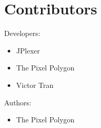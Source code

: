 \documentclass{article}
\begin{document}
\section{Contributors}
Developers:
\begin{itemize}
    \item JPlexer
    \item The Pixel Polygon
    \item Victor Tran
\end{itemize}
Authors:
\begin{itemize}
    \item The Pixel Polygon
\end{itemize}
\end{document}
